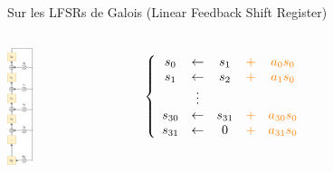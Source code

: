 \begin{frame}{Sur les LFSRs de Galois (Linear Feedback Shift Register)}
    \begin{columns}[c]
        
        \begin{center}                  
            \includegraphics[width=0.23\textwidth]{img/crypto/gea/lfsr.png}
        \end{center}
        \pause

\[\left\{
    \begin{array}{c c c c c}
        s_0 &\leftarrow & s_1 &\textcolor{orange}{+}& \textcolor{orange}{a_0s_0}\\
        s_1 &\leftarrow & s_2 &\textcolor{orange}{+}& \textcolor{orange}{a_1s_0}\\
        &\vdots& \\
        s_{30} &\leftarrow & s_{31} &\textcolor{orange}{+}& \textcolor{orange}{a_{30}s_0}\\
         s_{31} &\leftarrow & 0 &\textcolor{orange}{+}& \textcolor{orange}{a_{31}s_0}\\
    \end{array}
\right.\]


\end{columns}
\end{frame}
